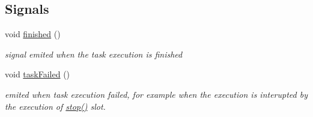 \subsection*{Signals}
\begin{DoxyCompactItemize}
\item 
\hypertarget{class_exp_task_aeb51d072a7b96f55da3738a8c7733611}{}void \hyperlink{class_exp_task_aeb51d072a7b96f55da3738a8c7733611}{finished} ()\label{class_exp_task_aeb51d072a7b96f55da3738a8c7733611}

\begin{DoxyCompactList}\small\item\em signal emited when the task execution is finished \end{DoxyCompactList}\item 
\hypertarget{class_exp_task_a1a766503f6eb22b82c6e31e279b0ea9d}{}void \hyperlink{class_exp_task_a1a766503f6eb22b82c6e31e279b0ea9d}{task\+Failed} ()\label{class_exp_task_a1a766503f6eb22b82c6e31e279b0ea9d}

\begin{DoxyCompactList}\small\item\em emited when task execution failed, for example when the execution is interupted by the execution of \hyperlink{class_exp_task_a22f581786f11fa3c7dc52ff90c6b7043}{stop()} slot. \end{DoxyCompactList}\end{DoxyCompactItemize}
